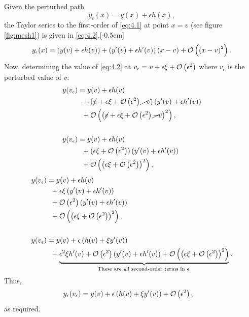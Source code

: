 Given the perturbed path
\begin{equation}
	\label{eq:4.1}
	y_\epsilon(x) = y(x) + \epsilon h(x),
\end{equation}
the Taylor series to the first-order of \eqref{eq:4.1} at point $x=v$ (see figure \ref{fig:mesh1}) is given in \eqref{eq:4.2}.[-0.5cm]
\begin{equation}
\begin{split}
\label{eq:4.2}
y_\epsilon(x)=\left(y(v) + \epsilon h(v)\right) + \left(y^\prime(v) + \epsilon h^\prime(v)\right)(x - v) + \mathcal{O}\left(\left(x -v\right)^2\right).
\end{split}
\end{equation}
Now, determining the value of \eqref{eq:4.2} at $v_\epsilon = v + \epsilon \xi + \mathcal{O}\left(\epsilon^2\right)$ where $v_\epsilon$ is the perturbed value of $v$:
\begin{equation*}
\begin{split}
y(v_\epsilon)&= y(v) + \epsilon h(v)\\ 
&\;\;+ (\cancel{v} + \epsilon \xi + \mathcal{O}\left(\epsilon^2\right)\cancel{-v})\left(y^\prime(v) +\epsilon h^\prime(v)\right)\\ 
&\;\;+ \mathcal{O}\left(\left(\cancel{v} + \epsilon \xi + \mathcal{O}\left(\epsilon^2\right)\cancel{-v}\right)^2\right),\\\\
y(v_\epsilon)&= y(v) + \epsilon h(v)\\
&\;\;+ (\epsilon \xi + \mathcal{O}\left(\epsilon^2\right))\left(y^\prime(v) +\epsilon h^\prime(v)\right)\\
&\;\;+ \mathcal{O}\left(\left(\epsilon \xi + \mathcal{O}\left(\epsilon^2\right)\right)^2\right),
\end{split}
\end{equation*}
\begin{equation*}
\begin{split}
y(v_\epsilon)&= y(v) + \epsilon h(v)\\
&\;\;+ \epsilon\xi\left(y^\prime(v) +\epsilon h^\prime(v)\right)\\
&\;\;+ \mathcal{O}\left(\epsilon^2\right)\left(y^\prime(v) +\epsilon h^\prime(v)\right)\\
&\;\;+ \mathcal{O}\left(\left(\epsilon \xi + \mathcal{O}\left(\epsilon^2\right)\right)^2\right),\\\\
y(v_\epsilon)&=y(v) + \epsilon \left(h(v) + \xi y^\prime(v)\right)\\
&\;\;+ \underbrace{\epsilon^2\xi h^\prime(v)
+ \mathcal{O} \left(\epsilon^2\right)\left(y^\prime(v) +\epsilon h^\prime(v)\right)+ \mathcal{O}\left(\left(\epsilon \xi + \mathcal{O}\left(\epsilon^2\right)\right)^2\right)}_\text{These are all second-order terms in $\epsilon$.}.
\end{split}
\end{equation*}
Thus,
\begin{equation}
\label{eq:4.3}
\begin{split}
y_\epsilon(v_\epsilon)&=y(v) + \epsilon \left(h(v) + \xi y^\prime(v)\right) + \mathcal{O}\left(\epsilon^2\right),
\end{split}
\end{equation}
as required.

